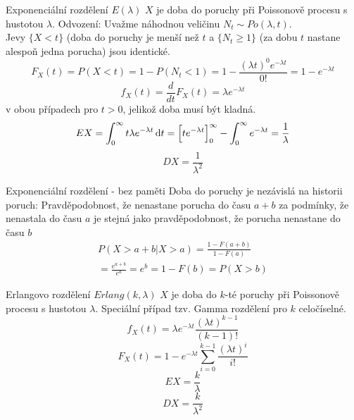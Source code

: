 \documentclass[smaller]{beamer}
\def\d{\,{\rm d}}               %
\def\red#1{{\usebeamercolor[fg]{my red} #1}}
\begin{document}
\begin{frame}{Exponenciální rozdělení $E(\lambda)$}
$X$ je doba do poruchy při Poissonově procesu s hustotou $\lambda$. Odvození:
\vspace{2ex}
Uvažme náhodnou veličinu $N_t \sim Po(\lambda, t)$.\\
Jevy $\{X<t\}$ (doba do poruchy je menší než $t$ 
a $\{N_t \ge 1\}$ (za dobu $t$ nastane alespoň jedna porucha) jsou identické.\\
\[
 F_X(t)=P(X<t) = 1 - P(N_t <1) = 1 - \frac{(\lambda t)^0 e^{-\lambda t}}{0!} = 1 - e^{-\lambda t}
\]
\[
  f_X(t) = \frac{d}{dt} F_X(t) = \lambda e^{-\lambda t}
\]
v obou případech pro $t>0$, jelikož doba musí být kladná.
\[
 EX = \int_0^\infty t\lambda e^{-\lambda t} \d t 
 = \Big[te^{-\lambda t}\Big]_0^{\infty} - \int_0^\infty e^{-\lambda t}
 = \frac{1}{\lambda}
\]
\[
 DX = \frac{1}{\lambda^2}
\]
\end{frame}

\begin{frame}{Exponenciální rozdělení - bez paměti}
Doba do poruchy je nezávislá na historii poruch:
Pravděpodobnost, že nenastane porucha do času $a+b$ za podmínky, že nenastala do
času $a$ je stejná jako pravděpodobnost, že porucha nenastane do času $b$
\begin{multline*}
 P(X > a+b | X>a) = \frac{1-F(a+b)}{1-F(a)} \\
= \frac{e^{a+b}}{e^a} = e^b = 1 - F(b) = P(X>b)
\end{multline*}

\end{frame}


\begin{frame}{Erlangovo rozdělení $Erlang(k,\lambda)$}
$X$ je doba do $k$-té poruchy při Poissonově procesu s hustotou $\lambda$. 
Speciální případ tzv. \red{Gamma rozdělení} pro $k$ celočíselné.
\[
 f_X(t)=\lambda e^{-\lambda t} \frac{(\lambda t)^{k-1}}{(k-1)!}
\]
\[
  F_X(t) = 1- e^{-\lambda t}\sum_{i=0}^{k-1} \frac{(\lambda t)^{i}}{i!}
\]
\[
 EX = \frac{k}{\lambda}
\]
\[
 DX = \frac{k}{\lambda^2}
\]

\end{frame}
\end{document}

